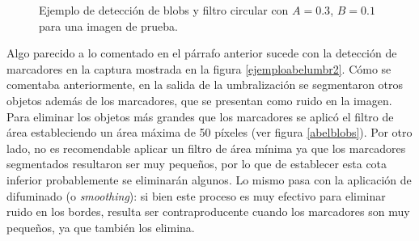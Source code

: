 \begin{figure}[ht!]
  \caption{Ejemplo de detección de blobs y filtro circular con $A=0.3$, $B=0.1$ para una imagen de prueba.}
      \label{ejemplodetectCirculos}
\end{figure}

Algo parecido a lo comentado en el párrafo anterior sucede con la detección de marcadores en la captura mostrada en la figura \ref{ejemploabelumbr2}. Cómo se comentaba anteriormente, en la salida de la umbralización se segmentaron otros objetos además de los marcadores, que se presentan como ruido en la imagen. Para eliminar los objetos más grandes que los marcadores se aplicó el filtro de área estableciendo un área máxima de 50 píxeles (ver figura \ref{abelblobs}). Por otro lado, no es recomendable aplicar un filtro de área mínima ya que los marcadores segmentados resultaron ser muy pequeños, por lo que de establecer esta cota inferior probablemente se eliminarán algunos. Lo mismo pasa con la aplicación de difuminado (o \textit{smoothing}): si bien este proceso es muy efectivo para eliminar ruido en los bordes, resulta ser contraproducente cuando los marcadores son muy pequeños, ya que también los elimina.

